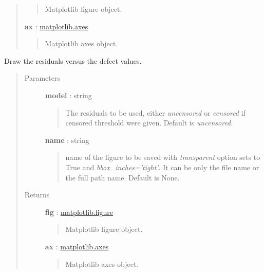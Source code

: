 \documentclass[letterpaper,10pt,english]{sphinxmanual}
\begin{document}
\begin{fulllineitems}
\begin{fulllineitems}
\begin{quote}
\begin{description}
\begin{quote}
Matplotlib figure object.
\end{quote}

\textbf{ax} : \href{http://matplotlib.org/api/axes\_api.html}{matplotlib.axes}
\begin{quote}

Matplotlib axes object.
\end{quote}

\end{description}\end{quote}

\end{fulllineitems}


\begin{fulllineitems}
\label{_generated/otpod.UnivariateLinearModelAnalysis:otpod.UnivariateLinearModelAnalysis.drawResiduals}
Draw the residuals versus the defect values.
\begin{quote}\begin{description}
\item[{Parameters}] \leavevmode
\textbf{model} : string
\begin{quote}

The residuals to be used, either \emph{uncensored} or
\emph{censored} if censored threshold were given. Default is \emph{uncensored}.
\end{quote}

\textbf{name} : string
\begin{quote}

name of the figure to be saved with \emph{transparent} option sets to True
and \emph{bbox\_inches='tight'}. It can be only the file name or the 
full path name. Default is None.
\end{quote}

\item[{Returns}] \leavevmode
\textbf{fig} : \href{http://matplotlib.org/api/figure\_api.html}{matplotlib.figure}
\begin{quote}

Matplotlib figure object.
\end{quote}

\textbf{ax} : \href{http://matplotlib.org/api/axes\_api.html}{matplotlib.axes}
\begin{quote}

Matplotlib axes object.
\end{quote}


\end{description}
\end{quote}
\end{fulllineitems}
\end{fulllineitems}
\end{document}
